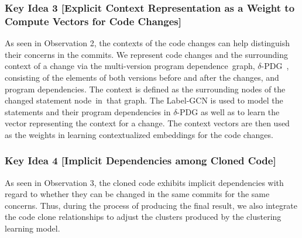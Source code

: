 
\subsubsection{\bf Key Idea 3 [Explicit Context Representation as a Weight to
    Compute Vectors for Code Changes]}

As seen in Observation 2, the contexts of the code changes can help
distinguish their concerns in the commits. We represent code changes
and the surrounding context of a change via the multi-version program
dependence~graph, $\delta$-PDG~\cite{flexeme-fse20}, consisting of the
elements of both versions before and after the changes, and program
dependencies. The context is defined as the surrounding nodes of the
changed statement node~in~that graph. The Label-GCN is used to model
the statements and their program dependencies in $\delta$-PDG as well
as to learn the vector representing the context for a change. The
context vectors are then used as the weights in learning
contextualized embeddings for the code changes.


\subsubsection{\bf Key Idea 4 [Implicit Dependencies among Cloned Code]}

As seen in Observation 3, the cloned code exhibits implicit
dependencies with regard to whether they can be changed in the same
commits for the same concerns. Thus, during the process of producing
the final result, we also integrate the code clone relationships to
adjust the clusters produced by the clustering learning model.


